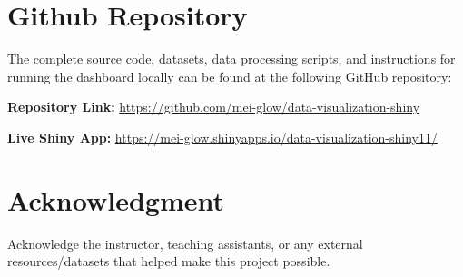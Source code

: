 \documentclass[12pt,conference]{IEEEtran}
\begin{document}


\section{Github Repository}
The complete source code, datasets, data processing scripts, and instructions for running the dashboard locally can be found at the following GitHub repository:

\vspace{0.5em}
\noindent \textbf{Repository Link:} \href{https://github.com/mei-glow/data-visualization-shiny}{\url{https://github.com/mei-glow/data-visualization-shiny}}

\vspace{0.5em}
\noindent \textbf{Live Shiny App:} \href{https://mei-glow.shinyapps.io/data-visualization-shiny11/}{\url{https://mei-glow.shinyapps.io/data-visualization-shiny11/}}

\section*{Acknowledgment}
Acknowledge the instructor, teaching assistants, or any external resources/datasets that helped make this project possible.



\end{document}
